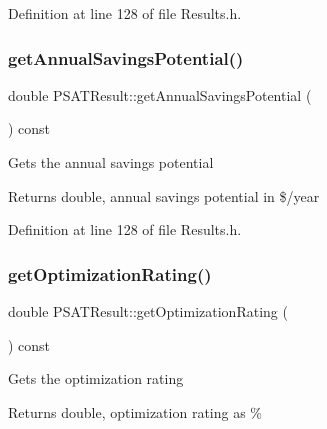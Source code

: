 Definition at line 128 of file Results.\+h.

\mbox{\label{class_p_s_a_t_result_a14fc75c2e0e92f74e3df1b97ed13b496}} 
\subsubsection{\texorpdfstring{get\+Annual\+Savings\+Potential()}{getAnnualSavingsPotential()}\hspace{0.1cm}{\footnotesize\ttfamily [3/3]}}
{\footnotesize\ttfamily double P\+S\+A\+T\+Result\+::get\+Annual\+Savings\+Potential (\begin{DoxyParamCaption}{ }\end{DoxyParamCaption}) const\hspace{0.3cm}{\ttfamily [inline]}}

Gets the annual savings potential \begin{DoxyReturn}{Returns}
double, annual savings potential in \$/year 
\end{DoxyReturn}


Definition at line 128 of file Results.\+h.

\mbox{\label{class_p_s_a_t_result_aa0a7001461408fcb06a6c22ce2d064db}} 
\subsubsection{\texorpdfstring{get\+Optimization\+Rating()}{getOptimizationRating()}\hspace{0.1cm}{\footnotesize\ttfamily [1/3]}}
{\footnotesize\ttfamily double P\+S\+A\+T\+Result\+::get\+Optimization\+Rating (\begin{DoxyParamCaption}{ }\end{DoxyParamCaption}) const\hspace{0.3cm}{\ttfamily [inline]}}

Gets the optimization rating \begin{DoxyReturn}{Returns}
double, optimization rating as \% 
\end{DoxyReturn}


